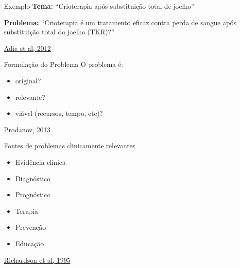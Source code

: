 \documentclass{beamer}
\begin{document}




\begin{frame}
  \begin{exampleblock}{Exemplo}
    \small
    {\bf Tema: }``Crioterapia após substituição total de joelho''

    \bigskip

    {\bf Problema:} ``Crioterapia é um tratamento eficaz contra perda de sangue após substituição total do joelho (TKR)?''
  \end{exampleblock}

  \vfill
  \scriptsize
  \hfill \href{https://doi.org/10.1002/14651858.CD007911.pub2}{Adie et al, 2012}
\end{frame}

\begin{frame}{Formulação do Problema}
O problema é:
  \begin{itemize}
    \footnotesize
  \item original?
    \bigskip
  \item relevante?
    \bigskip
  \item viável (recursos, tempo, etc)?
  \end{itemize}

  \vfill
  \scriptsize
  \hfill Prodanov, 2013
\end{frame}

\begin{frame}{Fontes de problemas clinicamente relevantes}
  \begin{itemize}
    \footnotesize
  \item Evidência clínica
    \medskip
  \item Diagnóstico
    \medskip
  \item Prognóstico
    \medskip
  \item Terapia
    \medskip
  \item Prevenção
    \medskip
  \item Educação
  \end{itemize}

  \vfill
  \scriptsize
  \hfill \href{https://acpjc.acponline.org/Content/123/3/issue/ACPJC-1995-123-3-A12.htm}
      {Richardson et al, 1995}
\end{frame}
\end{document}
